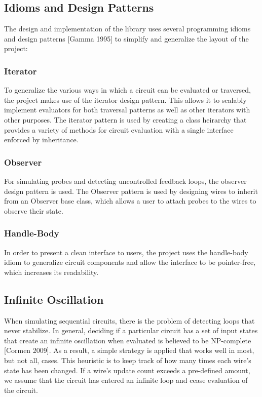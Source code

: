 \documentclass{article}
\begin{document}
\subsection{Idioms and Design Patterns}

The design and implementation of the library uses several programming idioms and design patterns [Gamma 1995] to simplify and generalize the layout of the project:

\subsubsection{Iterator}

To generalize the various ways in which a circuit can be evaluated or traversed, the project makes use of the iterator design pattern. This allows it to scalably implement evaluators for both traversal patterns as well as other iterators with other purposes. The iterator pattern is used by creating a class heirarchy that provides a variety of methods for circuit evaluation with a single interface enforced by inheritance.

\subsubsection{Observer}

For simulating probes and detecting uncontrolled feedback loops, the observer design pattern is used. The Observer pattern is used by designing wires to inherit from an Observer base class, which allows a user to attach probes to the wires to observe their state.

\subsubsection{Handle-Body}

In order to present a clean interface to users, the project uses the handle-body idiom to generalize circuit components and allow the interface to be pointer-free, which increases its readability.

\subsection{Infinite Oscillation}

When simulating sequential circuits, there is the problem of detecting loops that never stabilize. In general, deciding if a particular circuit has a set of input states that create an infinite oscillation when evaluated is believed to be NP-complete [Cormen 2009]. As a result, a simple strategy is applied that works well in most, but not all, cases. This heuristic is to keep track of how many times each wire’s state has been changed. If a wire's update count exceeds a pre-defined amount, we assume that the circuit has entered an infinite loop and cease evaluation of the circuit.
\end{document}
